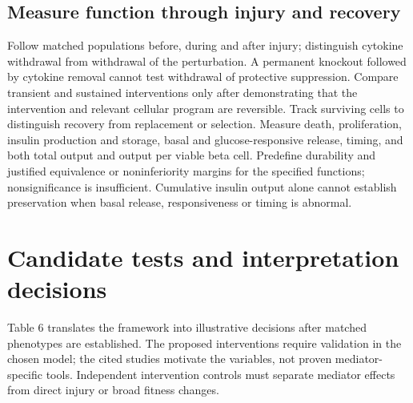 \documentclass[10pt,letterpaper]{article}
\begin{document}
\subsection*{Measure function through injury and recovery}
Follow matched populations before, during and after injury; distinguish cytokine withdrawal from withdrawal of the perturbation. A permanent knockout followed by cytokine removal cannot test withdrawal of protective suppression. Compare transient and sustained interventions only after demonstrating that the intervention and relevant cellular program are reversible. Track surviving cells to distinguish recovery from replacement or selection. Measure death, proliferation, insulin production and storage, basal and glucose-responsive release, timing, and both total output and output per viable beta cell. Predefine durability and justified equivalence or noninferiority margins for the specified functions; nonsignificance is insufficient. Cumulative insulin output alone cannot establish preservation when basal release, responsiveness or timing is abnormal.

\clearpage
\section*{Candidate tests and interpretation decisions}
Table 6 translates the framework into illustrative decisions after matched phenotypes are established. The proposed interventions require validation in the chosen model; the cited studies motivate the variables, not proven mediator-specific tools. Independent intervention controls must separate mediator effects from direct injury or broad fitness changes.
\end{document}
